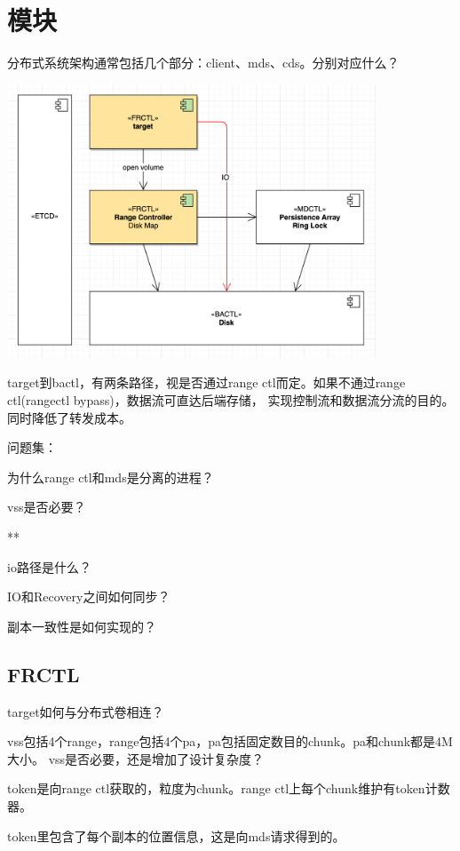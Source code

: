 \section{模块}

分布式系统架构通常包括几个部分：client、mds、cds。分别对应什么？
\begin{center}
\includegraphics[width=11cm]{../imgs/modules.png}
\end{center}

target到bactl，有两条路径，视是否通过range ctl而定。如果不通过range ctl(rangectl bypass)，数据流可直达后端存储，
实现控制流和数据流分流的目的。同时降低了转发成本。

问题集：
\begin{enumbox}
\item 为什么range ctl和mds是分离的进程？
\item vss是否必要？
\item ***
\item io路径是什么？
\item IO和Recovery之间如何同步？
\item 副本一致性是如何实现的？
\end{enumbox}

\subsection{FRCTL}

target如何与分布式卷相连？

vss包括4个range，range包括4个pa，pa包括固定数目的chunk。pa和chunk都是4M大小。
vss是否必要，还是增加了设计复杂度？

token是向range ctl获取的，粒度为chunk。range ctl上每个chunk维护有token计数器。

token里包含了每个副本的位置信息，这是向mds请求得到的。


